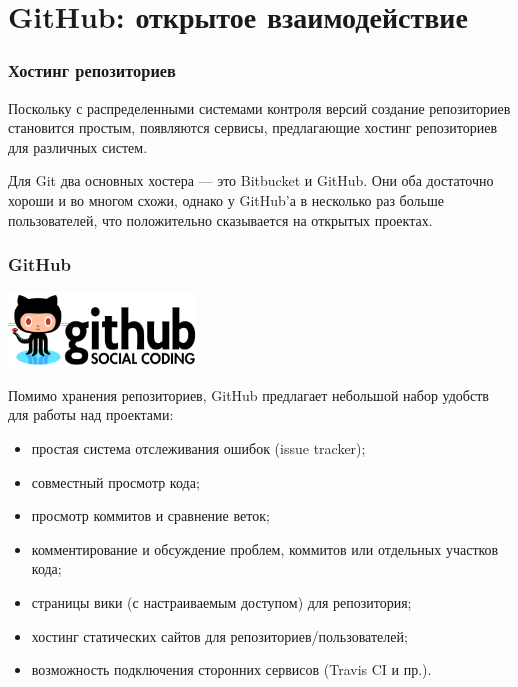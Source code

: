 \documentclass{beamer}
\begin{document}
\section{GitHub: открытое взаимодействие}

\begin{frame}
  \frametitle{Хостинг репозиториев}
  \begin{block}{}
    Поскольку с распределенными системами контроля версий создание репозиториев
    становится простым, появляются сервисы, предлагающие хостинг репозиториев для
    различных систем.
  \end{block}

  \begin{block}{}
    Для Git два основных хостера --- это Bitbucket и GitHub. Они оба достаточно
    хороши и во многом схожи, однако у GitHub'а в несколько раз больше пользователей,
    что положительно сказывается на открытых проектах.
  \end{block}
\end{frame}

\begin{frame}
  \frametitle{GitHub}
  \begin{center}
    \includegraphics[width=5cm]{images/github-logo.png}
  \end{center}

  Помимо хранения репозиториев, GitHub предлагает небольшой набор удобств для
  работы над проектами:

  \begin{itemize}
    \item простая система отслеживания ошибок (issue tracker);
    \item совместный просмотр кода;
    \item просмотр коммитов и сравнение веток;
    \item комментирование и обсуждение проблем, коммитов или отдельных участков кода;
    \item страницы вики (с настраиваемым доступом) для репозитория;
    \item хостинг статических сайтов для репозиториев/пользователей;
    \item возможность подключения сторонних сервисов (Travis CI и пр.).
  \end{itemize}
\end{frame}
\end{document}
